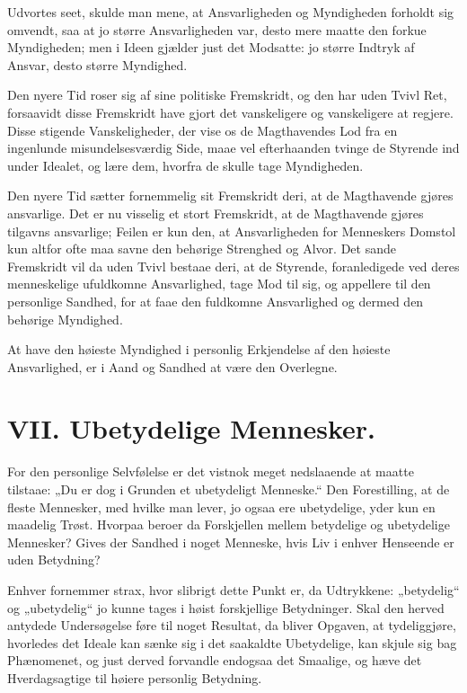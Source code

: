 \documentclass[12pt,a4paper]{book}
\newcommand{\apage}[1]{\marginnote{\footnotesize\textit{[#1]}}}
\begin{document}
Udvortes seet, skulde man mene, at Ansvarligheden og Myndigheden
forholdt sig omvendt, saa at jo større Ansvarligheden var, desto mere
maatte den forkue Myndigheden; men i Ideen gjælder just det
Modsatte: jo større Indtryk af Ansvar, desto større Myndighed.

Den nyere Tid roser sig af sine politiske Fremskridt, og den har
uden Tvivl Ret, forsaavidt disse Fremskridt have gjort det
vanskeligere og vanskeligere at regjere. Disse stigende
Vanskeligheder, der vise os de Magthavendes Lod fra en ingenlunde
misundelsesværdig Side, maae vel efterhaanden tvinge de Styrende ind
under Idealet, og lære dem, hvorfra de skulle tage Myndigheden.

Den nyere Tid sætter fornemmelig sit Fremskridt deri, at de
Magthavende gjøres ansvarlige. Det er nu visselig et stort
Fremskridt, at de Magthavende gjøres tilgavns ansvarlige; Feilen er
kun den, at Ansvarligheden for Menneskers Domstol kun altfor ofte maa
savne den behørige Strenghed og Alvor. Det sande Fremskridt vil da
uden Tvivl bestaae deri, at de Styrende, foranledigede ved deres
menneskelige \apage{67}
ufuldkomne Ansvarlighed, tage Mod til sig, og appellere til den
personlige Sandhed, for at faae den fuldkomne Ansvarlighed og dermed
den behørige Myndighed.

At have den høieste Myndighed i personlig Erkjendelse af den høieste
Ansvarlighed, er i Aand og Sandhed at være den Overlegne.

\chapter*{VII. Ubetydelige Mennesker.}
\label{ch:forel7} \apage{68}

For den personlige Selvfølelse er det vistnok meget nedslaaende at maatte tilstaae: „Du er dog i Grunden et ubetydeligt Menneske.“ Den Forestilling, at de fleste Mennesker, med hvilke man lever, jo ogsaa ere ubetydelige, yder kun en maadelig Trøst. Hvorpaa beroer da Forskjellen mellem betydelige og ubetydelige Mennesker? Gives der Sandhed i noget Menneske, hvis Liv i enhver Henseende er uden Betydning?

Enhver fornemmer strax, hvor slibrigt dette Punkt er, da Udtrykkene: „betydelig“ og „ubetydelig“ jo kunne tages i høist forskjellige Betydninger. Skal den herved antydede Undersøgelse føre til noget Resultat, da bliver Opgaven, at tydeliggjøre, hvorledes det Ideale kan sænke sig i det saakaldte Ubetydelige, kan skjule sig bag Phænomenet, og just derved forvandle endogsaa det Smaalige, og hæve det Hverdagsagtige til høiere personlig Betydning.
\end{document}
